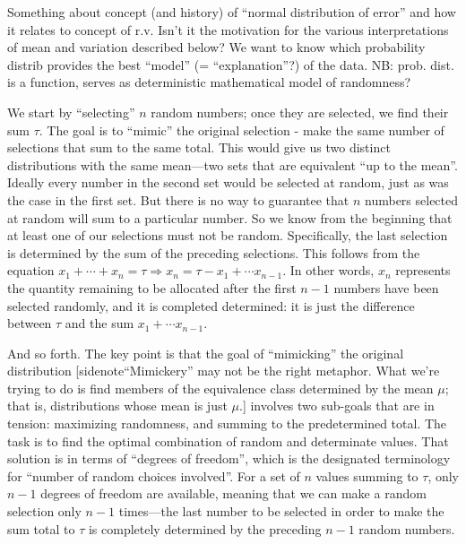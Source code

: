\begin{ednote}
  Something about concept (and history) of ``normal distribution of
  error'' and how it relates to concept of r.v.  Isn't it the
  motivation for the various interpretations of mean and variation
  described below?  We want to know which probability distrib provides
  the best ``model'' (= ``explanation''?) of the data.  NB:
  prob. dist. is a function, serves as deterministic mathematical
  model of randomness?
\end{ednote}

\begin{ednote}
  We start by ``selecting'' \(n\) random numbers; once they are
  selected, we find their sum \(\tau\).  The goal is to ``mimic'' the
  original selection - make the same number of selections that sum to
  the same total.  This would give us two distinct distributions with
  the same mean---two sets that are equivalent ``up to the mean''.
  Ideally every number in the second set would be selected at random,
  just as was the case in the first set.  But there is no way to
  guarantee that \(n\) numbers selected at random will sum to a
  particular number.  So we know from the beginning that at least one
  of our selections must not be random.  Specifically, the last
  selection is determined by the sum of the preceding selections.
  This follows from the equation \(x_1 +\cdots +x_n = \tau \Rightarrow
  x_n = \tau - x_1 +\cdots x_{n-1}\).  In other words, \(x_n\)
  represents the quantity remaining to be allocated after the first
  \(n-1\) numbers have been selected randomly, and it is completed
  determined: it is just the difference between \(\tau\) and the sum \(x_1 +\cdots x_{n-1}\).

  And so forth.  The key point is that the goal of ``mimicking'' the
  original distribution [sidenote{``Mimickery'' may not be the right
      metaphor.  What we're trying to do is find members of the
      equivalence class determined by the mean \(\mu\); that is,
      distributions whose mean is just \(\mu\).}] involves two
  sub-goals that are in tension: maximizing randomness, and summing to
  the predetermined total.  The task is to find the optimal
  combination of random and determinate values.  That solution is in
  terms of ``degrees of freedom'', which is the designated terminology
  for ``number of random choices involved''.  For a set of \(n\)
  values summing to \(\tau\), only \(n-1\) degrees of freedom are
  available, meaning that we can make a random selection only \(n-1\)
  times---the last number to be selected in order to make the sum
  total to \(\tau\) is completely determined by the preceding \(n-1\)
  random numbers.


\end{ednote}
